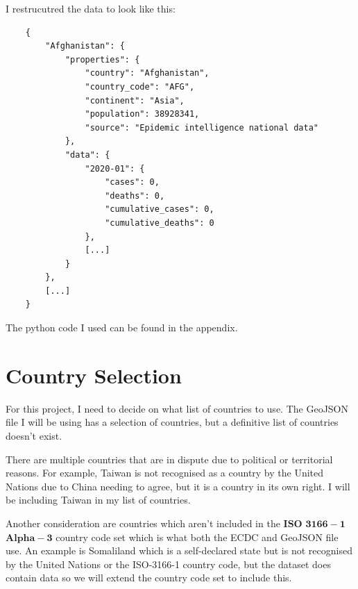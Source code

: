 \documentclass{report}
\begin{document}
I restrucutred the data to look like this:
\begin{center}
    \begin{lstlisting}
    {
        "Afghanistan": {
            "properties": {
                "country": "Afghanistan",
                "country_code": "AFG",
                "continent": "Asia",
                "population": 38928341,
                "source": "Epidemic intelligence national data"
            },
            "data": {
                "2020-01": {
                    "cases": 0,
                    "deaths": 0,
                    "cumulative_cases": 0,
                    "cumulative_deaths": 0
                },
                [...]
            }
        },
        [...]
    }
    \end{lstlisting}
\end{center}
The python code I used can be found in the appendix.

\section{Country Selection}
For this project, I need to decide on what list of countries to use. The GeoJSON file I will be using has a selection of countries, but a definitive list of countries doesn't exist.

There are multiple countries that are in dispute due to political or territorial reasons. For example, Taiwan is not recognised as a country by the United Nations due to China needing to agree, but it is a country in its own right. I will be including Taiwan in my list of countries.

Another consideration are countries which aren't included in the $\mathbf{ISO}$ $\mathbf{3166-1}$ $\mathbf{Alpha-3}$ country code set which is what both the ECDC and GeoJSON file use. An example is Somaliland which is a self-declared state but is not recognised by the United Nations or the ISO-3166-1 country code, but the dataset does contain data so we will extend the country code set to include this.
\end{document}
